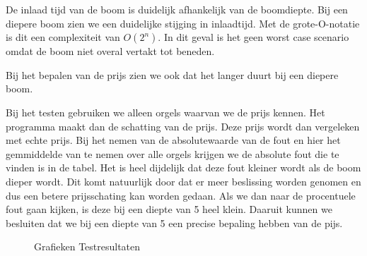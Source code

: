 De inlaad tijd van de boom is duidelijk afhankelijk van de boomdiepte. Bij een diepere boom zien we een duidelijke stijging in inlaadtijd. Met de grote-O-notatie is dit een complexiteit van $ O({2^n}) $. In dit geval is het geen worst case scenario omdat de boom niet overal vertakt tot beneden.

Bij het bepalen van de prijs zien we ook dat het langer duurt bij een diepere boom.

Bij het testen gebruiken we alleen orgels waarvan we de prijs kennen. Het programma maakt dan de schatting van de prijs. Deze prijs wordt dan vergeleken met echte prijs. Bij het nemen van de absolutewaarde van de fout en hier het gemmiddelde van te nemen over alle orgels krijgen we de absolute fout die te vinden is in de tabel. Het is heel dijdelijk dat deze fout kleiner wordt als de boom dieper wordt. Dit komt natuurlijk door dat er meer beslissing worden genomen en dus een betere prijsschating kan worden gedaan. Als we dan naar de procentuele fout gaan kijken, is deze bij een diepte van 5 heel klein. Daaruit kunnen we besluiten dat we bij een diepte van 5 een precise bepaling hebben van de pijs.
\begin{figure}[ht]
    \centering


    \caption{Grafieken Testresultaten}
    \label{fig:test_result}
\end{figure}


